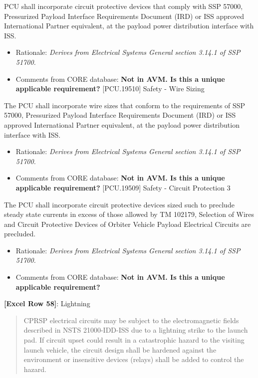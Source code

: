 PCU shall incorporate circuit protective devices that comply with SSP 57000, Pressurized Payload Interface Requirements Document (IRD) or ISS approved International Partner equivalent, at the payload power distribution interface with ISS.

\begin{itemize}
\item{} Rationale: \emph{Derives from Electrical Systems General section 3.14.1 of SSP 51700.}

\item{} Comments from CORE database: \textbf{\textbf{Not in AVM. Is this a unique applicable requirement?}}
[PCU.19510] Safety - Wire Sizing

\end{itemize}

The PCU shall incorporate wire sizes that conform to the requirements of SSP 57000, Pressurized Payload Interface Requirements Document (IRD) or ISS approved International Partner equivalent, at the payload power distribution interface with ISS.

\begin{itemize}
\item{} Rationale: \emph{Derives from Electrical Systems General section 3.14.1 of SSP 51700.}

\item{} Comments from CORE database: \textbf{\textbf{Not in AVM. Is this a unique applicable requirement?}}
[PCU.19509] Safety - Circuit Protection 3

\end{itemize}

The PCU shall incorporate circuit protective devices sized such to preclude steady state currents in excess of those allowed by TM 102179, Selection of Wires and Circuit Protective Devices of Orbiter Vehicle Payload Electrical Circuits are precluded.

\begin{itemize}
\item{} Rationale: \emph{Derives from Electrical Systems General section 3.14.1 of SSP 51700.}

\item{} Comments from CORE database: \textbf{\textbf{Not in AVM. Is this a unique applicable requirement?}}

\end{itemize}

\textbf{[Excel Row 58]}: Lightning

\begin{quote}
CPRSP electrical circuits may be subject to the electromagnetic fields described in NSTS 21000-IDD-ISS due to a lightning strike to the launch pad. If circuit upset could result in a catastrophic hazard to the visiting launch vehicle, the circuit design shall be hardened against the environment or insensitive devices (relays) shall be added to control the hazard.
\end{quote}

